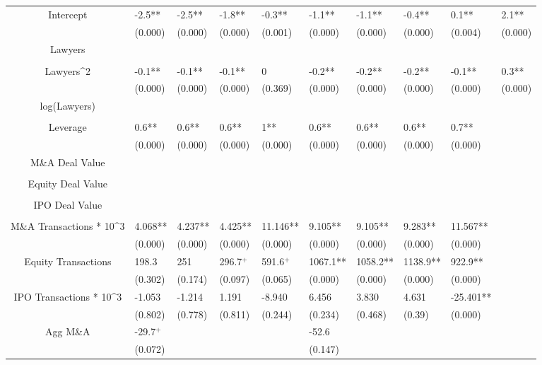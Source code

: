 \documentclass{article}
\begin{document}
\begin{table}[H]
\begin{tabular}{|clllllllll|}
Intercept & -2.5** & -2.5** & -1.8** & -0.3** & -1.1** & -1.1** & -0.4** & 0.1** & 2.1** \\ 
   & (0.000) & (0.000) & (0.000) & (0.001) & (0.000) & (0.000) & (0.000) & (0.004) & (0.000) \\ 
  Lawyers &  &  &  &  &  &  &  &  &  \\ 
   &  &  &  &  &  &  &  &  &  \\ 
  Lawyers^2 & -0.1** & -0.1** & -0.1** & 0 & -0.2** & -0.2** & -0.2** & -0.1** & 0.3** \\ 
   & (0.000) & (0.000) & (0.000) & (0.369) & (0.000) & (0.000) & (0.000) & (0.000) & (0.000) \\ 
  log(Lawyers) &  &  &  &  &  &  &  &  &  \\ 
   &  &  &  &  &  &  &  &  &  \\ 
  Leverage & 0.6** & 0.6** & 0.6** & 1** & 0.6** & 0.6** & 0.6** & 0.7** &  \\ 
   & (0.000) & (0.000) & (0.000) & (0.000) & (0.000) & (0.000) & (0.000) & (0.000) &  \\ 
  M\&A Deal Value &  &  &  &  &  &  &  &  &  \\ 
   &  &  &  &  &  &  &  &  &  \\ 
  Equity Deal Value &  &  &  &  &  &  &  &  &  \\ 
   &  &  &  &  &  &  &  &  &  \\ 
  IPO Deal Value &  &  &  &  &  &  &  &  &  \\ 
   &  &  &  &  &  &  &  &  &  \\ 
  M\&A Transactions * 10^3 & 4.068** & 4.237** & 4.425** & 11.146** & 9.105** & 9.105** & 9.283** & 11.567** &  \\ 
   & (0.000) & (0.000) & (0.000) & (0.000) & (0.000) & (0.000) & (0.000) & (0.000) &  \\ 
  Equity Transactions & 198.3 & 251 & 296.7$^{+}$ & 591.6$^{+}$ & 1067.1** & 1058.2** & 1138.9** & 922.9** &  \\ 
   & (0.302) & (0.174) & (0.097) & (0.065) & (0.000) & (0.000) & (0.000) & (0.000) &  \\ 
  IPO Transactions * 10^3 & -1.053 & -1.214 & 1.191 & -8.940 & 6.456 & 3.830 & 4.631 & -25.401** &  \\ 
   & (0.802) & (0.778) & (0.811) & (0.244) & (0.234) & (0.468) & (0.39) & (0.000) &  \\ 
  Agg M\&A & -29.7$^{+}$ &  &  &  & -52.6 &  &  &  &  \\ 
   & (0.072) &  &  &  & (0.147) &  &  &  &  \\ 

\end{tabular}
\end{table}
\end{document}
